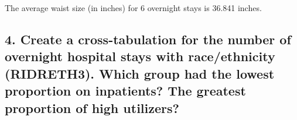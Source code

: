 \documentclass[]{article}
\newenvironment{Shaded}{\begin{snugshade}}{\end{snugshade}}
\newcommand{\DataTypeTok}[1]{\textcolor[rgb]{0.13,0.29,0.53}{#1}}
\newcommand{\DecValTok}[1]{\textcolor[rgb]{0.00,0.00,0.81}{#1}}
\newcommand{\KeywordTok}[1]{\textcolor[rgb]{0.13,0.29,0.53}{\textbf{#1}}}
\newcommand{\NormalTok}[1]{#1}
\newcommand{\OperatorTok}[1]{\textcolor[rgb]{0.81,0.36,0.00}{\textbf{#1}}}
\newcommand{\StringTok}[1]{\textcolor[rgb]{0.31,0.60,0.02}{#1}}
\begin{document}
The average waist size (in inches) for 6 overnight stays is 36.841
inches.

\hypertarget{create-a-cross-tabulation-for-the-number-of-overnight-hospital-stays-with-raceethnicity-ridreth3.-which-group-had-the-lowest-proportion-on-inpatients-the-greatest-proportion-of-high-utilizers}{%
\subsection{4. Create a cross-tabulation for the number of overnight
hospital stays with race/ethnicity (RIDRETH3). Which group had the
lowest proportion on inpatients? The greatest proportion of high
utilizers?}\label{create-a-cross-tabulation-for-the-number-of-overnight-hospital-stays-with-raceethnicity-ridreth3.-which-group-had-the-lowest-proportion-on-inpatients-the-greatest-proportion-of-high-utilizers}}

\begin{Shaded}
\end{Shaded}
\end{document}

